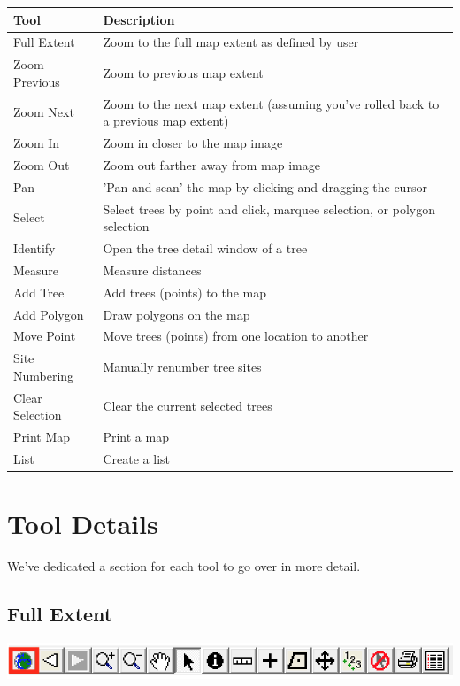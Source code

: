 \documentclass[]{book}
\begin{document}
\begin{tabular}{l|l}
\hline
Tool & Description\\
\hline
Full Extent & Zoom to the full map extent as defined by user\\
\hline
Zoom Previous & Zoom to previous map extent\\
\hline
Zoom Next & Zoom to the next map extent (assuming you've rolled back to a previous map extent)\\
\hline
Zoom In & Zoom in closer to the map image\\
\hline
Zoom Out & Zoom out farther away from map image\\
\hline
Pan & 'Pan and scan' the map by clicking and dragging the cursor\\
\hline
Select & Select trees by point and click, marquee selection, or polygon selection\\
\hline
Identify & Open the tree detail window of a tree\\
\hline
Measure & Measure distances\\
\hline
Add Tree & Add trees (points) to the map\\
\hline
Add Polygon & Draw polygons on the map\\
\hline
Move Point & Move trees (points) from one location to another\\
\hline
Site Numbering & Manually renumber tree sites\\
\hline
Clear Selection & Clear the current selected trees\\
\hline
Print Map & Print a map\\
\hline
List & Create a list\\
\hline
\end{tabular}

\hypertarget{tool-details}{%
\section{Tool Details}\label{tool-details}}

We've dedicated a section for each tool to go over in more detail.

\hypertarget{full-extent}{%
\subsection{Full Extent}\label{full-extent}}

\includegraphics[width=10.36in]{images/toolbar-full-view}
\end{document}
